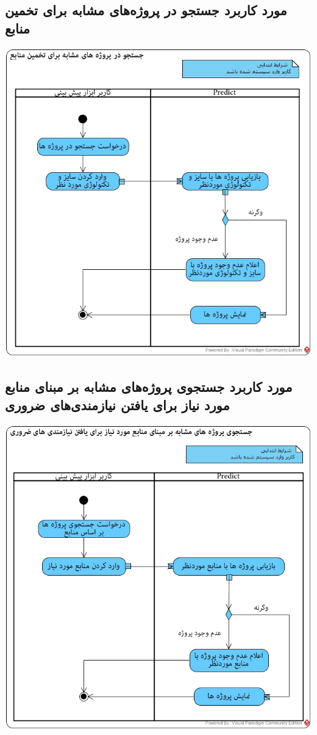 \subsection*{مورد کاربرد جستجو در پروژه‌های مشابه برای تخمین منابع}
\vspace{2cm}
\begin{center}
\includegraphics[width=\textwidth]{ActivityDiagramsWithSwimlanes/44.jpg}
\end{center}


\newpage
\vspace{2cm}
\subsection*{مورد کاربرد جستجوی پروژه‌های مشابه بر مبنای منابع مورد نیاز برای یافتن نیازمندی‌های ضروری}
\vspace{2cm}
\begin{center}
\includegraphics[width=\textwidth]{ActivityDiagramsWithSwimlanes/45.jpg}
\end{center}
